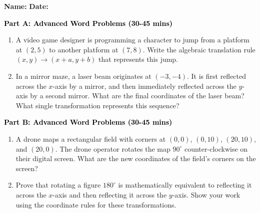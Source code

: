 \documentclass[12pt, letterpaper, fleqn]{article}
\begin{document}
\textbf{Name:} \underline{\hspace{5cm}}
\hfill
\textbf{Date:} \underline{\hspace{3cm}}\\


\begin{tcolorbox}[colback=customteal!20]
\large\textcolor{black}{\textbf{Part A: Advanced Word Problems (30-45 mins)}}
\end{tcolorbox}

\vspace{3mm}

\begin{enumerate}[itemsep=5.5cm, leftmargin=0.6cm]
\item A video game designer is programming a character to jump from a platform at $(2, 5)$ to another platform at $(7, 8)$. Write the algebraic translation rule $(x, y) \rightarrow (x+a, y+b)$ that represents this jump.
\item In a mirror maze, a laser beam originates at $(-3, -4)$. It is first reflected across the $x$-axis by a mirror, and then immediately reflected across the $y$-axis by a second mirror. What are the final coordinates of the laser beam? What single transformation represents this sequence?
\end{enumerate}

\newpage

\begin{tcolorbox}[colback=customteal!20]
\large\textcolor{black}{\textbf{Part B: Advanced Word Problems (30-45 mins)}}
\end{tcolorbox}

\vspace{3mm}

\begin{enumerate}[itemsep=5.5cm, leftmargin=0.6cm, resume]
\item A drone maps a rectangular field with corners at $(0,0)$, $(0, 10)$, $(20, 10)$, and $(20, 0)$. The drone operator rotates the map $90^\circ$ counter-clockwise on their digital screen. What are the new coordinates of the field's corners on the screen?
\item Prove that rotating a figure $180^\circ$ is mathematically equivalent to reflecting it across the $x$-axis and then reflecting it across the $y$-axis. Show your work using the coordinate rules for these transformations.
\end{enumerate}

\newpage
\end{document}
